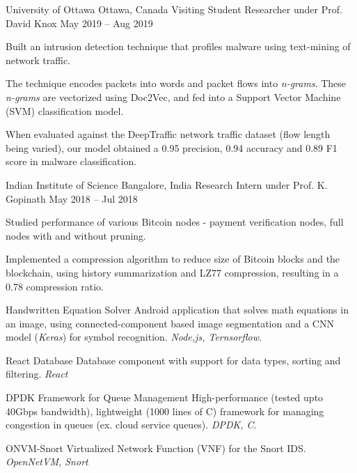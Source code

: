 \documentclass[10pt,letterpaper]{article}
\begin{document}
\headedsection
{University of Ottawa}
{Ottawa, Canada}
{Visiting Student Researcher under Prof. David Knox}
{May 2019 -- Aug 2019}{
	\begin{circlist}
		\item Built an intrusion detection technique that profiles malware using text-mining of network traffic.
		\item The technique encodes packets into words and packet flows into \textit{n-grams}. These \textit{n-grams} are vectorized using Doc2Vec, and fed into a Support Vector Machine (SVM) classification model.
		\item When evaluated against the DeepTraffic network traffic dataset (flow length being varied), our model obtained a 0.95 precision, 0.94 accuracy and 0.89 F1 score in malware classification.
	\end{circlist}
}

\headedsection
{Indian Institute of Science}
{Bangalore, India}
{Research Intern under Prof. K. Gopinath}
{May 2018 -- Jul 2018}{
	\begin{circlist}
		\item Studied performance of various Bitcoin nodes - payment verification nodes, full nodes with and without pruning.
		\item Implemented a compression algorithm to reduce size of Bitcoin blocks and the blockchain, using history summarization and LZ77 compression, resulting in a 0.78 compression ratio.
	\end{circlist}
}


\headedsectiontwo
{Handwritten Equation Solver}{}{}
{
	Android application that solves math equations in an image, using connected-component based image segmentation and a CNN model (\textit{Keras}) for symbol recognition. \textit{Node,js, Ternsorflow}.
}

\headedsectiontwo
{React Database}{}{}
{Database component with support for data types, sorting and filtering. \textit{React}}

\headedsectiontwo
{DPDK Framework for Queue Management}{}{}
{
	High-performance (tested upto 40Gbps bandwidth), lightweight (1000 lines of C) framework for managing congestion in queues (ex. cloud service queues). \textit{DPDK, C}.
}

\headedsectiontwo
{ONVM-Snort}{}{}{
	Virtualized Network Function (VNF) for the Snort IDS. \textit{OpenNetVM, Snort}}
\end{document}
